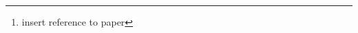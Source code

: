 \begin{abstract}
	This project has been developed as a workgroup for the course of
	\theclass{} (\thecourse, \theinstitute). The aim of this project is to
	change the Floodlight routing module in the same way done in
	\ldots\footnote{insert reference to paper} and to verify the results
	obtained by the authors of the cited document.
\end{abstract}
